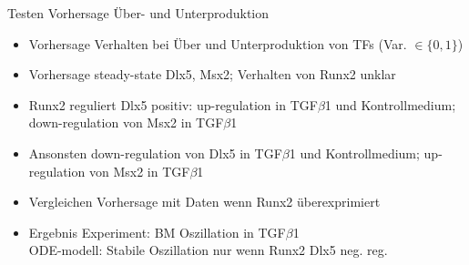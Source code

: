 \documentclass[]{beamer}
\begin{document}
\begin{frame}{Testen Vorhersage \"Uber- und Unterproduktion}
\begin{itemize}
	\item Vorhersage Verhalten bei \"Uber und Unterproduktion von TFs (Var. $\in \{0,1\}$)
	\pause
	\item Vorhersage steady-state Dlx5, Msx2; Verhalten von Runx2 unklar
	\pause
	\item Runx2 reguliert Dlx5 positiv: up-regulation in TGF$\beta$1 und Kontrollmedium; down-regulation von Msx2 in TGF$\beta$1
	\pause
	\item Ansonsten down-regulation von Dlx5 in TGF$\beta$1 und Kontrollmedium; up-regulation von Msx2 in TGF$\beta$1
	\pause
	\item Vergleichen Vorhersage mit Daten wenn Runx2 \"uberexprimiert
	\pause
	\item Ergebnis Experiment: BM Oszillation in TGF$\beta$1
	\pause
	\\ ODE-modell: Stabile Oszillation nur wenn Runx2 Dlx5 neg. reg.
\end{itemize}
\end{frame}
\end{document}
